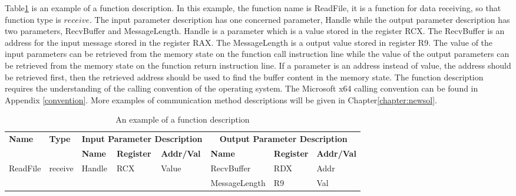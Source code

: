 Table\ref{functionexample} is an example of a function description. In this example, the function name is ReadFile, it is a function for data receiving, so that function type is $receive$. The input parameter description has one concerned parameter, Handle while the output parameter description has two parameters, RecvBuffer and MessageLength. Handle is a parameter which is a value stored in the register RCX. The RecvBuffer is an address for the input message stored in the register RAX. The MessageLength is a output value stored in register R9. The value of the input parameters can be retrieved from the memory state on the function call instruction line while the value of the output parameters can be retrieved from the memory state on the function return instruction line. If a parameter is an address instead of value, the address should be retrieved first, then the retrieved address should be used to find the buffer content in the memory state. The function description requires the understanding of the calling convention of the operating system. The Microsoft x64 calling convention can be found in Appendix \ref{convention}. More examples of communication method descriptions will be given in Chapter\ref{chapter:newsol}.

\begin{table}[H]
        \centering
        \caption{An example of a function description}
        \label{functionexample}
        \begin{tabular}{|l|l|l|l|l|l|l|l|}
            \hline
             \multirow{2}{*}{{\textbf{Name}}} & \multirow{2}{*}{{\textbf{Type}}} & \multicolumn{3}{c|}{\textbf{Input Parameter Description}} & \multicolumn{3}{c|}{\textbf{Output Parameter Description}} \\
              \cline{3-8} 
             & & \textbf{Name}& \textbf{Register} &  \textbf{Addr/Val} & \textbf{Name}& \textbf{Register} &  \textbf{Addr/Val}  \\
             \hline
             \multirow{2}{*}{ReadFile}
             &\multirow{2}{*}{receive} &  \multirow{2}{*}{Handle} & \multirow{2}{*}{RCX} & \multirow{2}{*}{Value} & RecvBuffer & RDX  & Addr\\
              \cline{6-8} 
             & & & & & MessageLength & R9  & Val\\
            \hline            
        \end{tabular}
    \end{table}

